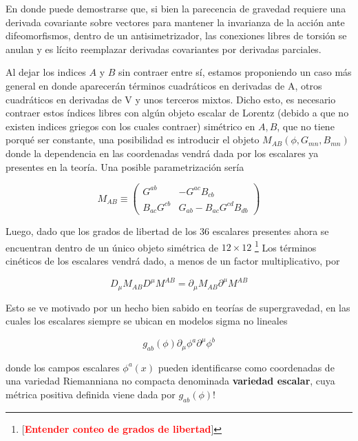 \documentclass{article}
\numberwithin{equation}{section}
\begin{document}
En donde puede demostrarse que, si bien la parecencia de gravedad requiere una derivada covariante sobre vectores para mantener la invarianza de la acción ante difeomorfismos, dentro de un antisimetrizador, las conexiones libres de torsión se anulan y es lícito reemplazar derivadas covariantes por derivadas parciales.

Al dejar los indices $ A $ y $ B $ sin contraer entre sí, estamos proponiendo un caso más general en donde aparecerán términos cuadráticos en derivadas de A, otros cuadráticos en derivadas de V y unos terceros mixtos. Dicho esto, es necesario contraer estos índices libres con algún objeto escalar de Lorentz (debido a que no existen indices griegos con los cuales contraer) simétrico en $ A, B $, que no tiene porqué ser constante, una posibilidad es introducir el objeto $ M_{A B} (\phi,G_{m n}, B_{m n}) $ donde la dependencia en las coordenadas vendrá dada por los escalares ya presentes en la teoría. Una posible parametrización sería

\begin{equation}\label{M}
M_{A B} \equiv \begin{pmatrix}
G^{a b} & - G^{a c} B_{c b}\\
B_{a c} G^{c b} & G_{a b} - B_{a c} G^{c d} B_{d b}
\end{pmatrix}
\end{equation}


Luego, dado que los grados de libertad de los 36 escalares presentes ahora se encuentran dentro de un único objeto simétrica de $ 12 \times 12 $
\footnote{[\textcolor{red}{\textbf{Entender conteo de grados de libertad}}]}
Los términos cinéticos de los escalares vendrá dado, a menos de un factor multiplicativo, por

\begin{equation}
D_{\mu} M_{A B} D^{\mu} M^{A B} = \partial_{\mu} M_{A B} \partial^{\mu} M^{A B}
\end{equation} 

Esto se ve motivado por un hecho bien sabido en teorías de supergravedad, en las cuales los escalares siempre se ubican en modelos sigma no lineales

\begin{equation}
g_{a b}(\phi) \partial_{\mu} \phi^a \partial^{\mu} \phi^b
\end{equation}

donde los campos escalares $ \phi^a(x) $ pueden identificarse como coordenadas de una variedad Riemanniana no compacta denominada \textbf{variedad escalar}, cuya métrica positiva definida viene dada por $ g_{a b} (\phi) $!
\end{document}
